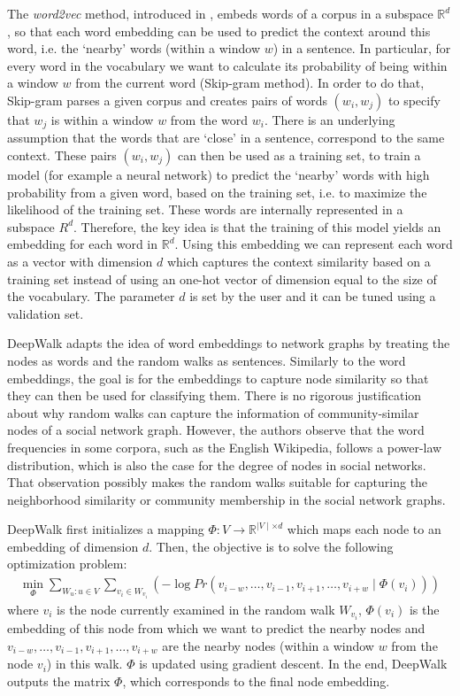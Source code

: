 The \emph{word2vec} method, introduced in \cite{mikolov2013efficient}, embeds 
words of a corpus in a subspace $\mathbb{R}^d$, so that each word embedding can 
be used to predict the context around this word, i.e. the `nearby' words (within 
a window $w$) in a sentence. In particular, for every word in the vocabulary we 
want to calculate its probability of being within a window $w$ from the current 
word (Skip-gram method). 
In order to do that, Skip-gram parses a given corpus and creates pairs of words 
$(w_i, w_j)$ to specify that $w_j$ is within a window $w$ from the word $w_i$. 
There is an underlying assumption that the words that are `close' in a 
sentence, correspond to the same context. These pairs $(w_i, w_j)$ can then be 
used as a training set, to train a model (for example a neural network) to 
predict the `nearby' words with high probability from a given word, based on the 
training set, i.e. to maximize the likelihood of the training set. These words 
are internally represented in a subspace $R^d$. Therefore, the key idea is that 
the training of this model yields an embedding for each word in $\mathbb{R}^d$.
Using this embedding we can represent each word as a vector with dimension $d$
which captures the context similarity based on a training set instead of using 
an one-hot vector of dimension equal to the size of the vocabulary. The parameter 
$d$ is set by the user and it can be tuned using a validation set.

DeepWalk adapts the idea of word embeddings to network graphs by treating the 
nodes as words and the random walks as sentences. Similarly to the word 
embeddings, the goal is for the embeddings to capture node similarity so that 
they can then be used for classifying them. There is no rigorous justification 
about why random walks can capture the information of community-similar nodes of 
a social network graph. However, the authors observe that the word frequencies in 
some corpora, such as the English Wikipedia, follows a power-law distribution, 
which is also the case for the degree of nodes in social networks. That 
observation possibly makes the random walks suitable for capturing the 
neighborhood similarity or community membership in the social network graphs.

DeepWalk first initializes a mapping 
$\Phi: V \to \mathbb{R}^{\mid V\mid \times d}$ which maps each node to an 
embedding of dimension $d$. Then, the objective is to solve the following 
optimization problem:
\begin{align}
    \min_{\Phi}
        \sum_{W_{u}: u \in V} \sum_{v_i \in W_{v_i}} \left (-\log{Pr({v_{i-w},
                \ldots, v_{i-1}, v_{i+1},
                \ldots , v_{i+w}} \mid \Phi(v_i))}
        \right )
\end{align}
where $v_i$ is the node currently examined in the random walk $W_{v_i}$, 
$\Phi(v_i)$ is the embedding of this node from which we want to predict the 
nearby nodes and $v_{i-w}, \ldots, v_{i-1}, v_{i+1}, \ldots, v_{i+w}$ are the 
nearby nodes (within a window $w$ from the node $v_i$) in this walk. 
$\Phi$ is updated using gradient descent. In the end, DeepWalk outputs the 
matrix $\Phi$, which corresponds to the final node embedding.


